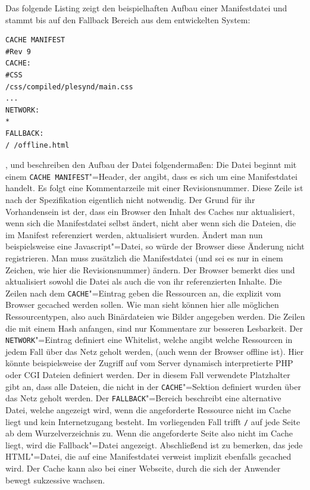 Das folgende Listing zeigt den beispielhaften Aufbau einer Manifestdatei und stammt bis auf den Fallback Bereich aus dem entwickelten System:
\begin{lstlisting}
CACHE MANIFEST
#Rev 9
CACHE:
#CSS
/css/compiled/plesynd/main.css
...
NETWORK:
*
FALLBACK:
/ /offline.html
\end{lstlisting}

\cite{W3C2012}, \cite{html5upandrunningchapter8} und \cite{Bidelman2010} beschreiben den Aufbau der Datei folgendermaßen: Die Datei beginnt mit einem \texttt{CACHE MANIFEST}"=Header, der angibt, dass es sich um eine Manifestdatei handelt. Es folgt eine Kommentarzeile mit einer Revisionsnummer. Diese Zeile ist nach der Spezifikation eigentlich nicht notwendig. Der Grund für ihr Vorhandensein ist der, dass ein Browser den Inhalt des Caches nur aktualisiert, wenn sich die Manifestdatei selbst ändert, nicht aber wenn sich die Dateien, die im Manifest referenziert werden, aktualisiert wurden. Ändert man nun beispielsweise eine Javascript"=Datei, so würde der Browser diese Änderung nicht registrieren. Man muss zusätzlich die Manifestdatei (und sei es nur in einem Zeichen, wie hier die Revisionsnummer) ändern. Der Browser bemerkt dies und aktualisiert sowohl die Datei als auch die von ihr referenzierten Inhalte. Die Zeilen nach dem \texttt{CACHE}"=Eintrag geben die Ressourcen an, die explizit vom Browser gecached werden sollen. Wie man sieht können hier alle möglichen Ressourcentypen, also auch Binärdateien wie Bilder angegeben werden. Die Zeilen die mit einem Hash anfangen, sind nur Kommentare zur besseren Lesbarkeit. Der \texttt{NETWORK}"=Eintrag definiert eine Whitelist, welche angibt welche Ressourcen in jedem Fall über das Netz geholt werden, (auch wenn der Browser offline ist). Hier könnte beispielsweise der Zugriff auf vom Server dynamisch interpretierte PHP oder CGI Dateien definiert werden. Der in diesem Fall verwendete Platzhalter gibt an, dass alle Dateien, die nicht in der \texttt{CACHE}"=Sektion definiert wurden über das Netz geholt werden. Der \texttt{FALLBACK}"=Bereich beschreibt eine alternative Datei, welche angezeigt wird, wenn die angeforderte Ressource nicht im Cache liegt und kein Internetzugang besteht. Im vorliegenden Fall trifft \texttt{/} auf jede Seite ab dem Wurzelverzeichnis zu. Wenn die angeforderte Seite also nicht im Cache liegt, wird die Fallback"=Datei angezeigt. Abschließend ist zu bemerken, das jede \ac{HTML}"=Datei, die auf eine Manifestdatei verweist implizit ebenfalls gecached wird. Der Cache kann also bei einer Webseite, durch die sich der Anwender bewegt sukzessive wachsen.

